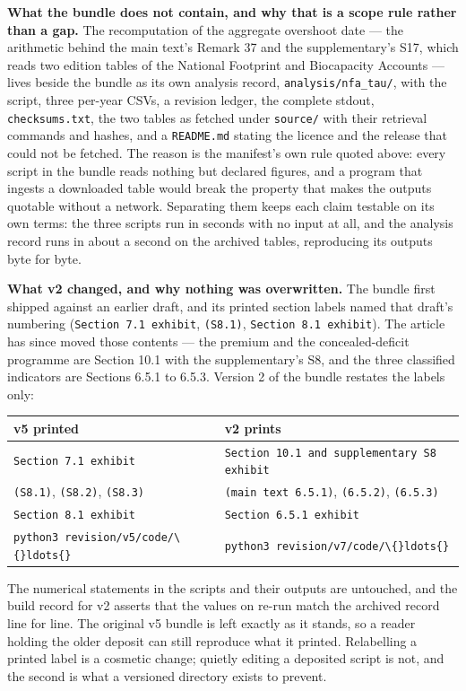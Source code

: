\documentclass[11pt]{article}
\begin{document}
\textbf{What the bundle does not contain, and why that is a scope rule rather than a gap.} The recomputation of the aggregate overshoot date --- the arithmetic behind the main text's Remark 37 and the supplementary's S17, which reads two edition tables of the National Footprint and Biocapacity Accounts --- lives beside the bundle as its own analysis record, \texttt{analysis/nfa\_tau/}, with the script, three per-year CSVs, a revision ledger, the complete stdout, \texttt{checksums.txt}, the two tables as fetched under \texttt{source/} with their retrieval commands and hashes, and a \texttt{README.md} stating the licence and the release that could not be fetched. The reason is the manifest's own rule quoted above: every script in the bundle reads nothing but declared figures, and a program that ingests a downloaded table would break the property that makes the outputs quotable without a network. Separating them keeps each claim testable on its own terms: the three scripts run in seconds with no input at all, and the analysis record runs in about a second on the archived tables, reproducing its outputs byte for byte.

\textbf{What v2 changed, and why nothing was overwritten.} The bundle first shipped against an earlier draft, and its printed section labels named that draft's numbering (\texttt{Section 7.1 exhibit}, \texttt{(S8.1)}, \texttt{Section 8.1 exhibit}). The article has since moved those contents --- the premium and the concealed-deficit programme are Section 10.1 with the supplementary's S8, and the three classified indicators are Sections 6.5.1 to 6.5.3. Version 2 of the bundle restates the labels only:

\begin{longtable}{@{}l|p{109mm}@{}}
\toprule
v5 printed & v2 prints \\
\midrule
\texttt{Section 7.1 exhibit} & \texttt{Section 10.1 and supplementary S8 exhibit} \\
\texttt{(S8.1)}, \texttt{(S8.2)}, \texttt{(S8.3)} & \texttt{(main text 6.5.1)}, \texttt{(6.5.2)}, \texttt{(6.5.3)} \\
\texttt{Section 8.1 exhibit} & \texttt{Section 6.5.1 exhibit} \\
\texttt{python3 revision/v5/code/\textbackslash\{\}ldots\{\}} & \texttt{python3 revision/v7/code/\textbackslash\{\}ldots\{\}} \\
\bottomrule
\end{longtable}

The numerical statements in the scripts and their outputs are untouched, and the build record for v2 asserts that the values on re-run match the archived record line for line. The original v5 bundle is left exactly as it stands, so a reader holding the older deposit can still reproduce what it printed. Relabelling a printed label is a cosmetic change; quietly editing a deposited script is not, and the second is what a versioned directory exists to prevent.
\end{document}
